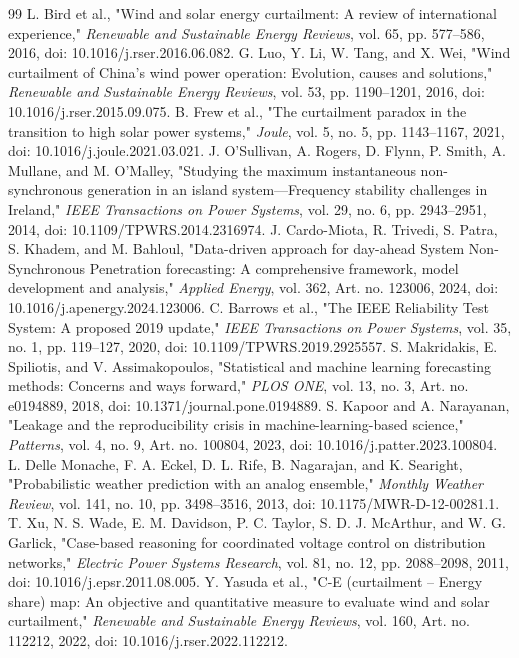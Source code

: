 \documentclass{ieeeaccess}
\begin{document}
\begin{thebibliography}{99}
 L. Bird et al., "Wind and solar energy curtailment: A review of international experience," \emph{Renewable and Sustainable Energy Reviews}, vol. 65, pp. 577--586, 2016, doi: 10.1016/j.rser.2016.06.082.
 G. Luo, Y. Li, W. Tang, and X. Wei, "Wind curtailment of China's wind power operation: Evolution, causes and solutions," \emph{Renewable and Sustainable Energy Reviews}, vol. 53, pp. 1190--1201, 2016, doi: 10.1016/j.rser.2015.09.075.
 B. Frew et al., "The curtailment paradox in the transition to high solar power systems," \emph{Joule}, vol. 5, no. 5, pp. 1143--1167, 2021, doi: 10.1016/j.joule.2021.03.021.
 J. O'Sullivan, A. Rogers, D. Flynn, P. Smith, A. Mullane, and M. O'Malley, "Studying the maximum instantaneous non-synchronous generation in an island system---Frequency stability challenges in Ireland," \emph{IEEE Transactions on Power Systems}, vol. 29, no. 6, pp. 2943--2951, 2014, doi: 10.1109/TPWRS.2014.2316974.
 J. Cardo-Miota, R. Trivedi, S. Patra, S. Khadem, and M. Bahloul, "Data-driven approach for day-ahead System Non-Synchronous Penetration forecasting: A comprehensive framework, model development and analysis," \emph{Applied Energy}, vol. 362, Art. no. 123006, 2024, doi: 10.1016/j.apenergy.2024.123006.
 C. Barrows et al., "The IEEE Reliability Test System: A proposed 2019 update," \emph{IEEE Transactions on Power Systems}, vol. 35, no. 1, pp. 119--127, 2020, doi: 10.1109/TPWRS.2019.2925557.
 S. Makridakis, E. Spiliotis, and V. Assimakopoulos, "Statistical and machine learning forecasting methods: Concerns and ways forward," \emph{PLOS ONE}, vol. 13, no. 3, Art. no. e0194889, 2018, doi: 10.1371/journal.pone.0194889.
 S. Kapoor and A. Narayanan, "Leakage and the reproducibility crisis in machine-learning-based science," \emph{Patterns}, vol. 4, no. 9, Art. no. 100804, 2023, doi: 10.1016/j.patter.2023.100804.
 L. Delle Monache, F. A. Eckel, D. L. Rife, B. Nagarajan, and K. Searight, "Probabilistic weather prediction with an analog ensemble," \emph{Monthly Weather Review}, vol. 141, no. 10, pp. 3498--3516, 2013, doi: 10.1175/MWR-D-12-00281.1.
 T. Xu, N. S. Wade, E. M. Davidson, P. C. Taylor, S. D. J. McArthur, and W. G. Garlick, "Case-based reasoning for coordinated voltage control on distribution networks," \emph{Electric Power Systems Research}, vol. 81, no. 12, pp. 2088--2098, 2011, doi: 10.1016/j.epsr.2011.08.005.
 Y. Yasuda et al., "C-E (curtailment -- Energy share) map: An objective and quantitative measure to evaluate wind and solar curtailment," \emph{Renewable and Sustainable Energy Reviews}, vol. 160, Art. no. 112212, 2022, doi: 10.1016/j.rser.2022.112212.

\end{thebibliography}
\end{document}
